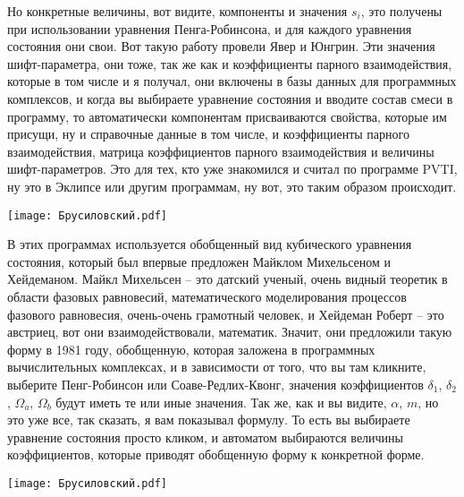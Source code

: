 \documentclass[main.tex]{subfiles}
\begin{document}
Но конкретные величины, вот видите, компоненты и значения $s_i$, это получены при использовании уравнения Пенга-Робинсона, и для каждого уравнения состояния они свои.
Вот такую работу провели Явер и Юнгрин.
Эти значения шифт-параметра, они тоже, так же как и коэффициенты парного взаимодействия, которые в том числе и я получал, они включены в базы данных для программных комплексов, и когда вы выбираете уравнение состояния и вводите состав смеси в программу, то автоматически компонентам присваиваются свойства, которые им присущи, ну и справочные данные в том числе, и коэффициенты парного взаимодействия, матрица коэффициентов парного взаимодействия и величины шифт-параметров.
Это для тех, кто уже знакомился и считал по программе PVTI, ну это в Эклипсе или другим программам, ну вот, это таким образом происходит.

\begin{center}
\texttt{[image: Брусиловский.pdf]}
\end{center}

В этих программах используется обобщенный вид кубического уравнения состояния, который был впервые предложен Майклом Михельсеном и Хейдеманом.
Майкл Михельсен -- это датский ученый, очень видный теоретик в области фазовых равновесий, математического моделирования процессов фазового равновесия, очень-очень грамотный человек, и Хейдеман Роберт -- это австриец, вот они взаимодействовали, математик.
Значит, они предложили такую форму в 1981 году, обобщенную, которая заложена в программных вычислительных комплексах, и в зависимости от того, что вы там кликните, выберите Пенг-Робинсон или Соаве-Редлих-Квонг, значения коэффициентов $\delta_1$, $\delta_2$, $\Omega_a$, $\Omega_b$ будут иметь те или иные значения.
Так же, как и вы видите, $\alpha$, $m$, но это уже все, так сказать, я вам показывал формулу.
То есть вы выбираете уравнение состояния просто кликом, и автоматом выбираются величины коэффициентов, которые приводят обобщенную форму к конкретной форме.

\begin{center}
\texttt{[image: Брусиловский.pdf]}
\end{center}
\end{document}
